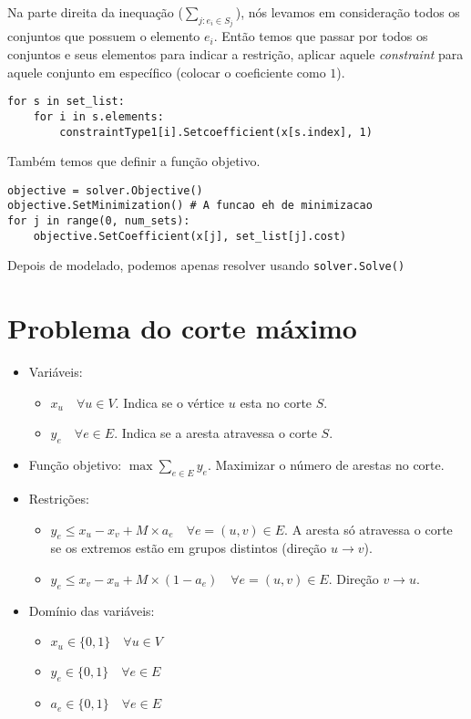 Na parte direita da inequação ($\sum_{j:e_i \in S_j}$), nós levamos em consideração todos os conjuntos que possuem o elemento $e_i$. Então temos que passar por todos os conjuntos e seus elementos para indicar a restrição, aplicar aquele \textit{constraint} para aquele conjunto em específico (colocar o coeficiente como $1$).

\begin{lstlisting}
for s in set_list:
    for i in s.elements:
        constraintType1[i].Setcoefficient(x[s.index], 1)
\end{lstlisting}

Também temos que definir a função objetivo.

\begin{lstlisting}
objective = solver.Objective()
objective.SetMinimization() # A funcao eh de minimizacao
for j in range(0, num_sets):
    objective.SetCoefficient(x[j], set_list[j].cost)
\end{lstlisting}

Depois de modelado, podemos apenas resolver usando \lstinline{solver.Solve()}

\section{Problema do corte máximo}

\begin{itemize}
    \item Variáveis:
    \begin{itemize}
        \item $x_u \quad \forall u \in V$. Indica se o vértice $u$ esta no corte $S$.
        \item $y_e \quad \forall e \in E$. Indica se a aresta atravessa o corte $S$.
    \end{itemize}
    \item Função objetivo: $\max\sum_{e \in E} y_e$. Maximizar o número de arestas no corte.
    \item Restrições:
    \begin{itemize}
        \item $y_e \leq x_u - x_v + M \times a_e \quad \forall e=(u,v)\in E$. A aresta só atravessa o corte se os extremos estão em grupos distintos (direção $u \to v$).
        \item $y_e \leq x_v - x_u + M \times (1-a_e) \quad \forall e=(u, v) \in E$. Direção $v \to u$.
    \end{itemize}
    \item Domínio das variáveis:
    \begin{itemize}
        \item $x_u \in \{0,1\} \quad \forall u \in V$
        \item $y_e \in \{0,1\} \quad \forall e \in E$
        \item $a_e \in \{0,1\} \quad \forall e \in E$
    \end{itemize}
\end{itemize}

